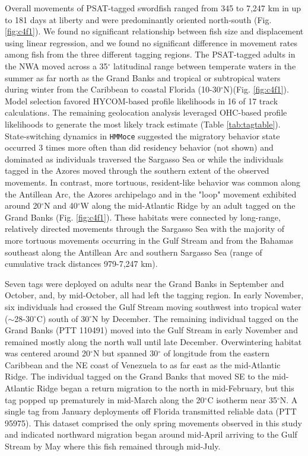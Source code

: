 Overall movements of PSAT-tagged swordfish ranged from 345 to 7,247 km in up to 181 days at liberty and were predominantly oriented north-south (Fig. \ref{fig:c4f1}). We found no significant relationship between fish size and displacement using linear regression, and we found no significant difference in movement rates among fish from the three different tagging regions. The PSAT-tagged adults in the NWA moved across a 35$^{\circ}$ latitudinal range between temperate waters in the summer as far north as the Grand Banks and tropical or subtropical waters during winter from the Caribbean to coastal Florida (10-30$^{\circ}$N)(Fig. \ref{fig:c4f1}). Model selection favored HYCOM-based profile likelihoods in 16 of 17 track calculations. The remaining geolocation analysis leveraged OHC-based profile likelihoods to generate the most likely track estimate (Table \ref{tab:tagtable}). State-switching dynamics in \texttt{HMMoce} suggested the migratory behavior state occurred 3 times more often than did residency behavior (not shown) and dominated as individuals traversed the Sargasso Sea or while the individuals tagged in the Azores moved through the southern extent of the observed movements. In contrast, more tortuous, resident-like behavior was common along the Antillean Arc, the Azores archipelago and in the "loop" movement exhibited around 20$^{\circ}$N and 40$^{\circ}$W along the mid-Atlantic Ridge by an adult tagged on the Grand Banks (Fig. \ref{fig:c4f1}). These habitats were connected by long-range, relatively directed movements through the Sargasso Sea with the majority of more tortuous movements occurring in the Gulf Stream and from the Bahamas southeast along the Antillean Arc and southern Sargasso Sea (range of cumulative track distances 979-7,247 km).

Seven tags were deployed on adults near the Grand Banks in September and October, and, by mid-October, all had left the tagging region. In early November, six individuals had crossed the Gulf Stream moving southwest into tropical water ($\sim$28-30$^{\circ}$C) south of 30$^{\circ}$N by December. The remaining individual tagged on the Grand Banks (PTT 110491) moved into the Gulf Stream in early November and remained mostly along the north wall until late December. Overwintering habitat was centered around 20$^{\circ}$N but spanned 30$^{\circ}$ of longitude from the eastern Caribbean and the NE coast of Venezuela to as far east as the mid-Atlantic Ridge. The individual tagged on the Grand Banks that moved SE to the mid-Atlantic Ridge began a return migration to the north in mid-February, but this tag popped up prematurely in mid-March along the 20$^{\circ}$C isotherm near 35$^{\circ}$N. A single tag from January deployments off Florida transmitted reliable data (PTT 95975). This dataset comprised the only spring movements observed in this study and indicated northward migration began around mid-April arriving to the Gulf Stream by May where this fish remained through mid-July.

